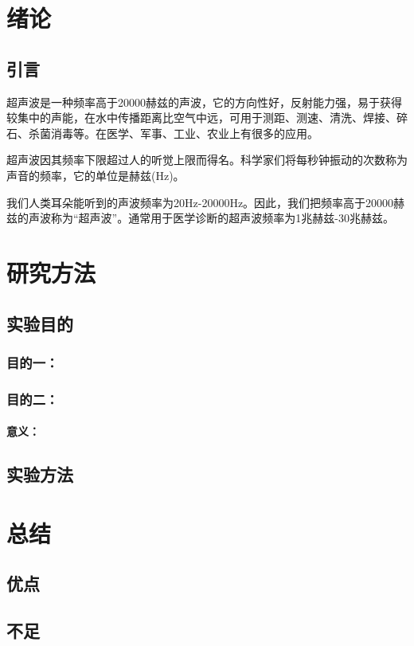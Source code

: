 \documentclass{ctexbook}%
\begin{document}
	\tableofcontents
	
	\chapter{绪论}	%
	\section{引言}	%
	超声波是一种频率高于20000赫兹的声波，它的方向性好，反射能力强，易于获得较集中的声能，在水中传播距离比空气中远，可用于测距、测速、清洗、焊接、碎石、杀菌消毒等。在医学、军事、工业、农业上有很多的应用。
	
	超声波因其频率下限超过人的听觉上限而得名。科学家们将每秒钟振动的次数称为声音的频率，它的单位是赫兹(Hz)。
	
	我们人类耳朵能听到的声波频率为20Hz-20000Hz。因此，我们把频率高于20000赫兹的声波称为“超声波”。通常用于医学诊断的超声波频率为1兆赫兹-30兆赫兹。
	
	\chapter{研究方法}
	\section{实验目的}
	\subsection{目的一：}	%
	\subsection{目的二：}
	\subsubsection{意义：}	%
	\section{实验方法}
	
	\chapter{总结}
	\section{优点}
	\section{不足}
\end{document}

